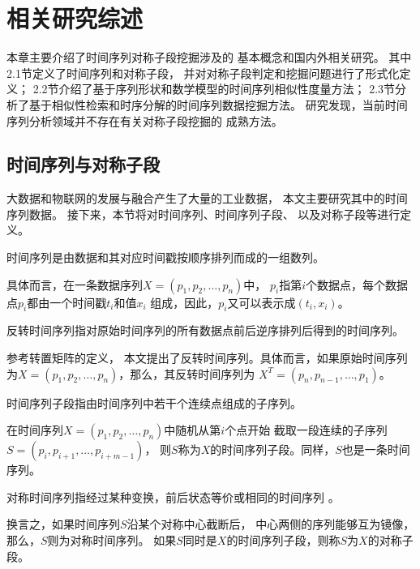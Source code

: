 
\chapter{相关研究综述}
本章主要介绍了时间序列对称子段挖掘涉及的
基本概念和国内外相关研究。
其中2.1节定义了时间序列和对称子段，
并对对称子段判定和挖掘问题进行了形式化定义；
2.2节介绍了基于序列形状和数学模型的时间序列相似性度量方法；
2.3节分析了基于相似性检索和时序分解的时间序列数据挖掘方法。
研究发现，当前时间序列分析领域并不存在有关对称子段挖掘的
成熟方法。

\section{时间序列与对称子段}
大数据和物联网的发展与融合产生了大量的工业数据，
本文主要研究其中的时间序列数据。
接下来，本节将对时间序列、时间序列子段、
以及对称子段等进行定义。

\begin{definition}
  时间序列是由数据和其对应时间戳按顺序排列而成的一组数列\cite{DBLP:journals/csur/EslingA12}。

  具体而言，在一条数据序列$X = \left( p_1,p_2,\dots,p_n \right)$中，
  $p_i$指第$i$个数据点，每个数据点$p_i$都由一个时间戳$t_i$和值$x_i$
  组成，因此，$p_i$又可以表示成$\left( t_i,x_i \right)$。
\end{definition}

\begin{definition}
  反转时间序列指对原始时间序列的所有数据点前后逆序排列后得到的时间序列。

  参考转置矩阵的定义\cite{DBLP:conf/vecpar/HishinumaHT16}，
  本文提出了反转时间序列。具体而言，如果原始时间序列
  为$X = \left( p_1,p_2,\dots,p_n \right)$，那么，其反转时间序列为
  $X^T = \left( p_n,p_{n-1},\dots,p_1 \right)$。
\end{definition}

\begin{definition}
  时间序列子段指由时间序列中若干个连续点组成的子序列\cite{DBLP:conf/pakdd/LinM10}。

  在时间序列$X=\left( p_1,p_2,\dots,p_n \right)$中随机从第$i$个点开始
  截取一段连续的子序列$S = \left( p_i,p_{i+1},\dots,p_{i+m-1} \right)$，
  则$S$称为$X$的时间序列子段。同样，$S$也是一条时间序列。
\end{definition}

\begin{definition}
  对称时间序列指经过某种变换，前后状态等价或相同的时间序列
  \cite{DBLP:journals/pami/NackmanP85}。

  换言之，如果时间序列$S$沿某个对称中心截断后，
  中心两侧的序列能够互为镜像，那么，$S$则为对称时间序列。
  如果$S$同时是$X$的时间序列子段，则称$S$为$X$的对称子段。
\end{definition}

